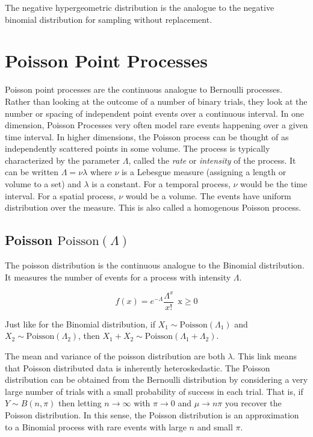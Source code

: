The negative hypergeometric distribution is the analogue to the negative binomial distribution for sampling without replacement. 


\section{Poisson Point Processes}
Poisson point processes are the continuous analogue to Bernoulli processes. Rather than looking at the outcome of a number of binary trials, they look at the number or spacing of independent point events over a continuous interval. In one dimension, Poisson Processes very often model rare events happening over a given time interval. In higher dimensions, the Poisson process can be thought of as independently scattered points in some volume. The process is typically characterized by the parameter $\Lambda$, called the \textit{rate} or \textit{intensity} of the process. It can be written $\Lambda = \nu \lambda$ where $\nu$ is a Lebesgue measure (assigning a length or volume to a set) and $\lambda$ is a constant. For a temporal process, $\nu$ would be the time interval. For a spatial process, $\nu$ would be a volume. The events have uniform distribution over the measure. This is also called a homogenous Poisson process. 

\subsection{Poisson $\mathrm{Poisson}(\Lambda)$}
The poisson distribution is the continuous analogue to the Binomial distribution. It measures the number of events for a process with intensity $\Lambda$.

\begin{equation}
f(x) = e^{-\Lambda}\frac{\Lambda^x}{x!}\ \ \mathrm{x\geq0}
\end{equation}

Just like for the Binomial distribution, if $X_1 \sim \mathrm{Poisson}(\Lambda_1)$ and $X_2 \sim \mathrm{Poisson}(\Lambda_2)$, then $X_1 + X_2 \sim \mathrm{Poisson}(\Lambda_1 + \Lambda_2)$. 

The mean and variance of the poisson distribution are both $\lambda$. This link means that Poisson distributed data is inherently heteroskedastic. The Poisson distribution can be obtained from the Bernoulli distribution by considering a very large number of trials with a small probability of success in each trial. That is, if $Y \sim B(n,\pi)$ then letting $n\rightarrow \infty$ with $\pi \rightarrow 0$ and $\mu \rightarrow n\pi$ you recover the Poisson distribution. In this sense, the Poisson distribution is an approximation to a Binomial process with rare events with large $n$ and small $\pi$. 



